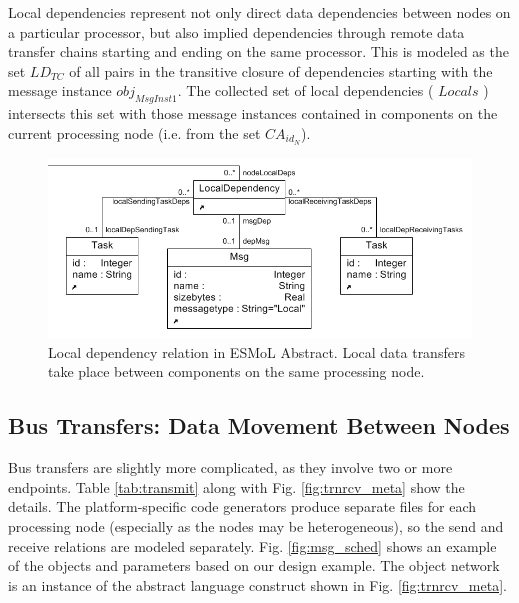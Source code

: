 Local dependencies represent not only direct data dependencies between nodes on
a particular processor, but also implied dependencies through remote data
transfer chains starting and ending on the same processor.   This is modeled as
the set $LD_{TC}$ of all pairs in the transitive closure of dependencies
starting with the message instance $obj_{MsgInst1}$. The collected set of local
dependencies ( $Locals$ ) intersects this set with those message instances
contained in components on the current processing node (i.e. from the set $CA_{id_N}$).

\begin{figure}
\centering
\includegraphics[width=0.9\columnwidth]{figures/localdeps.png}
    \caption{Local dependency relation in ESMoL Abstract. Local data
transfers take place between components on the same processing node.}
    \label{fig:localdep_meta}
\end{figure}

\subsection{ Bus Transfers: Data Movement Between Nodes}

Bus transfers are slightly more complicated, as they involve two or more
endpoints.  Table \ref{tab:transmit} along with Fig.
\ref{fig:trnrcv_meta} show the details. The platform-specific code generators
produce separate files for each processing node (especially as the nodes
may be heterogeneous), so the send and receive relations are modeled separately. Fig. 
\ref{fig:msg_sched} shows an example of the objects and parameters based on our
design example.  The object network is an instance of the abstract language construct
shown in Fig. \ref{fig:trnrcv_meta}.

